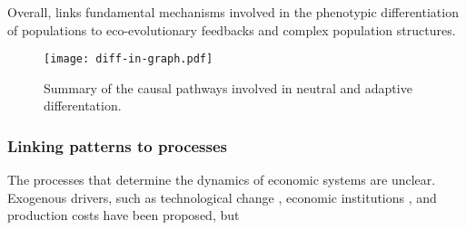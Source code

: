 Overall, \chapi links fundamental mechanisms involved in the phenotypic differentiation of populations to eco-evolutionary feedbacks and complex population structures. %

\begin{figure}[t]
    \centering
    \texttt{[image: diff-in-graph.pdf]}
    \caption{Summary of the causal pathways involved in neutral and adaptive differentation.}
\end{figure}
\subsubsection{Linking patterns to processes}

The processes that determine the dynamics of economic systems are unclear. 
% 
Exogenous drivers, such as technological change \cite{XXX}, economic institutions \cite{XXX}, and production costs \cite{Boschma2005a} have been proposed, but 























\printbibliography[heading=subbibliography]





